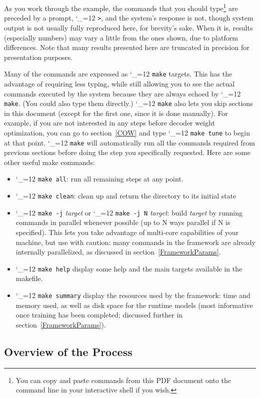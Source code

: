 \documentclass[11pt,letterpaper]{article}
\def\code{\begingroup\catcode`\_=12 \codex}
\newcommand{\codex}[1]{\texttt{#1}\endgroup}
\begin{document}
As you work through the example, the commands that you should
type\footnote{You can copy and paste commands from this PDF document onto
the command line in your interactive shell if you wish.} are preceded by a
prompt, \code{>}, and the system's response is not, though system output is not usually fully
reproduced here, for brevity's sake. When it is, results (especially numbers)
may vary a little from the ones shown, due to platform differences. Note that
many results presented here are truncated in precision for presentation purposes.

Many of the commands are expressed as \code{make} targets. This has the
advantage of requiring less typing, while still allowing you to see the actual
commands executed by the system because they are always echoed by \code{make}.
(You could also type them directly.) \code{make} also lets you skip
sections in this document (except for the first one, since it is done
manually). For example, if you are not interested in any steps before decoder
weight optimization, you can go to section~\ref{COW} and type \code{make
tune} to begin at that point. \code{make} will automatically run all the commands
required from previous sections before doing the step you specifically
requested. Here are some other useful make commands:
\begin{itemize}
\item \code{make all}: run all remaining steps at any point.
\item \code{make clean}: clean up and return the directory to its initial state
\item \code{make -j} \emph{target} or \code{make -j N} \emph{target}: build
      \emph{target} by running commands in parallel whenever possible (up to
      N ways parallel if N is specified). This lets you take advantage of
      multi-core capabilities of your machine, but use with caution: many
      commands in the framework are already internally parallelized, as
      discussed in section~\ref{FrameworkParams}.
\item \code{make help} display some help and the main targets available in
      the makefile.
\item \code{make summary} display the resources used by the framework: time and
      memory used, as well as disk space for the runtime models (most
      informative once training has been completed; discussed further in
      section~\ref{FrameworkParams}).
\end{itemize}

\subsection{Overview of the Process}
\end{document}
